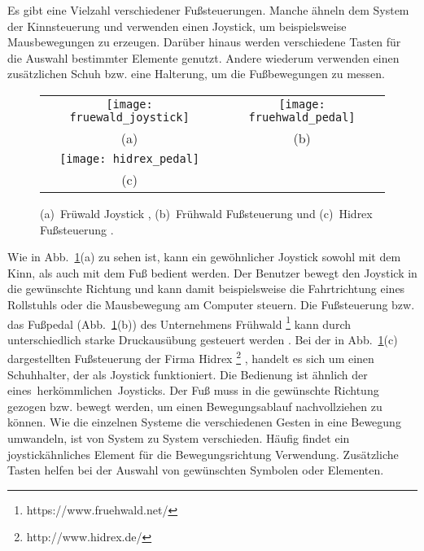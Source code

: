 Es gibt eine Vielzahl verschiedener Fußsteuerungen. Manche ähneln dem System der Kinnsteuerung und verwenden einen Joystick, um beispielsweise Mausbewegungen zu erzeugen. Darüber hinaus werden verschiedene Tasten für die Auswahl bestimmter Elemente genutzt. Andere wiederum verwenden einen zusätzlichen Schuh bzw. eine Halterung, um die Fußbewegungen zu messen.
%
%
\begin{figure}
\centering\small
\setlength{\tabcolsep}{0mm}	%
\begin{tabular}{c@{\hspace{0mm}}c} %
  \texttt{[image: fruewald\_joystick]} &
  \texttt{[image: fruehwald\_pedal]}
\\
  (a) & (b)
\\[7pt]	%
  \texttt{[image: hidrex\_pedal]}
\\
  (c)
\end{tabular}
%
\caption{(a)~Früwald Joystick \cite{FRUEHWALD}, (b)~Frühwald Fußsteuerung \cite{FRUEHWALD} und (c)~Hidrex Fußsteuerung \cite{HIDREX}.}
\label{fig:foot}
\end{figure}
%
%
\newline \newline
Wie in Abb.~\ref{fig:foot}(a) zu sehen ist, kann ein gewöhnlicher Joystick sowohl mit dem Kinn, als auch mit dem Fuß bedient werden. Der Benutzer bewegt den Joystick in die gewünschte Richtung und kann damit beispielsweise die Fahrtrichtung eines Rollstuhls oder die Mausbewegung am Computer steuern. Die Fußsteuerung bzw. das Fußpedal (Abb.~\ref{fig:foot}(b)) des Unternehmens Frühwald%
\footnote{https://www.fruehwald.net/}
%
kann durch unterschiedlich starke Druckausübung gesteuert werden \cite{FRUEHWALD}. 
\newline \newline 
Bei der in Abb.~\ref{fig:foot}(c) dargestellten Fußsteuerung der Firma Hidrex%
\footnote{http://www.hidrex.de/}%
, handelt es sich um einen Schuhhalter, der als Joystick funktioniert. Die Bedienung ist ähnlich der \mbox{eines herkömmlichen Joysticks}. Der Fuß muss in die gewünschte Richtung gezogen bzw. bewegt werden, um einen Bewegungsablauf nachvollziehen zu können.
%
\newline \newline
Wie die einzelnen Systeme die verschiedenen Gesten in eine Bewegung umwandeln, ist von System zu System verschieden. Häufig findet ein joystickähnliches Element für die Bewegungsrichtung Verwendung. Zusätzliche Tasten helfen bei der Auswahl von gewünschten Symbolen oder Elementen.

